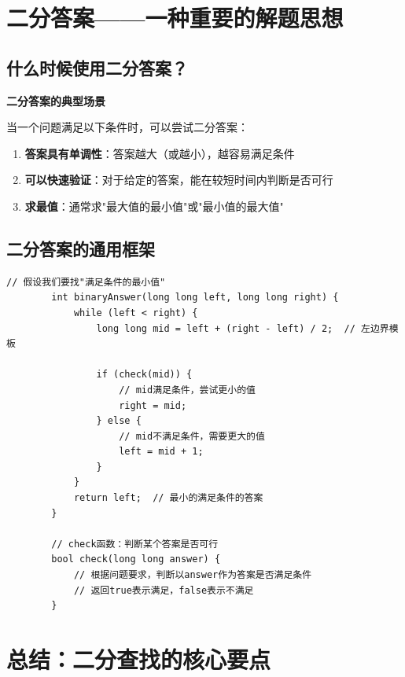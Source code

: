 \documentclass[12pt,a4paper]{article}
\begin{document}
	\section{二分答案——一种重要的解题思想}
	
	\subsection{什么时候使用二分答案？}
	
	\begin{bluebox}
		\textbf{二分答案的典型场景}
		
		当一个问题满足以下条件时，可以尝试二分答案：
		\begin{enumerate}
			\item \textbf{答案具有单调性}：答案越大（或越小），越容易满足条件
			\item \textbf{可以快速验证}：对于给定的答案，能在较短时间内判断是否可行
			\item \textbf{求最值}：通常求"最大值的最小值"或"最小值的最大值"
		\end{enumerate}
	\end{bluebox}
	
	\subsection{二分答案的通用框架}
	
	\begin{lstlisting}[caption={二分答案的通用模板}]
		// 假设我们要找"满足条件的最小值"
		int binaryAnswer(long long left, long long right) {
			while (left < right) {
				long long mid = left + (right - left) / 2;  // 左边界模板
				
				if (check(mid)) {
					// mid满足条件，尝试更小的值
					right = mid;
				} else {
					// mid不满足条件，需要更大的值
					left = mid + 1;
				}
			}
			return left;  // 最小的满足条件的答案
		}
		
		// check函数：判断某个答案是否可行
		bool check(long long answer) {
			// 根据问题要求，判断以answer作为答案是否满足条件
			// 返回true表示满足，false表示不满足
		}
	\end{lstlisting}
	
	\section{总结：二分查找的核心要点}
	
\end{document}
